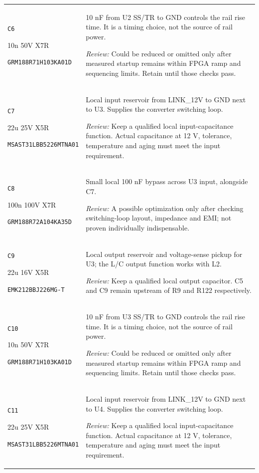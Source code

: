 \documentclass[10pt,a4paper]{article}
\begin{document}
\begin{longtable}{@{}P{46mm}P{117mm}@{}}
\nolinkurl{C6}\par 10n 50V X7R\par\scriptsize \nolinkurl{GRM188R71H103KA01D} & 10 nF from U2 SS/TR to GND controls the rail rise time. It is a timing choice, not the source of rail power.\par\smallskip\textit{Review:} Could be reduced or omitted only after measured startup remains within FPGA ramp and sequencing limits. Retain until those checks pass. \\
\nolinkurl{C7}\par 22u 25V X5R\par\scriptsize \nolinkurl{MSAST31LBB5226MTNA01} & Local input reservoir from LINK\_12V to GND next to U3. Supplies the converter switching loop.\par\smallskip\textit{Review:} Keep a qualified local input-capacitance function. Actual capacitance at 12 V, tolerance, temperature and aging must meet the input requirement. \\
\nolinkurl{C8}\par 100n 100V X7R\par\scriptsize \nolinkurl{GRM188R72A104KA35D} & Small local 100 nF bypass across U3 input, alongside C7.\par\smallskip\textit{Review:} A possible optimization only after checking switching-loop layout, impedance and EMI; not proven individually indispensable. \\
\nolinkurl{C9}\par 22u 16V X5R\par\scriptsize \nolinkurl{EMK212BBJ226MG-T} & Local output reservoir and voltage-sense pickup for U3; the L/C output function works with L2.\par\smallskip\textit{Review:} Keep a qualified local output capacitor. C5 and C9 remain upstream of R9 and R122 respectively. \\
\nolinkurl{C10}\par 10n 50V X7R\par\scriptsize \nolinkurl{GRM188R71H103KA01D} & 10 nF from U3 SS/TR to GND controls the rail rise time. It is a timing choice, not the source of rail power.\par\smallskip\textit{Review:} Could be reduced or omitted only after measured startup remains within FPGA ramp and sequencing limits. Retain until those checks pass. \\
\nolinkurl{C11}\par 22u 25V X5R\par\scriptsize \nolinkurl{MSAST31LBB5226MTNA01} & Local input reservoir from LINK\_12V to GND next to U4. Supplies the converter switching loop.\par\smallskip\textit{Review:} Keep a qualified local input-capacitance function. Actual capacitance at 12 V, tolerance, temperature and aging must meet the input requirement. \\

\end{longtable}
\end{document}
